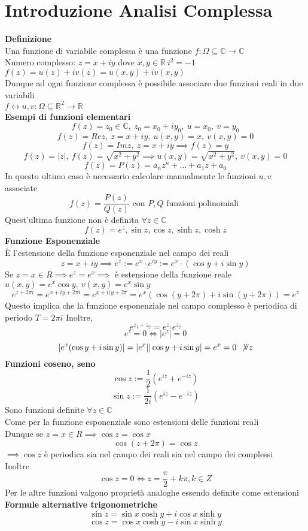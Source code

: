 
\section{Introduzione Analisi Complessa}
\textbf{Definizione}
\\Una funzione di variabile complessa è una funzione $f:\Omega\subseteq \mathbb{C}\to \mathbb{C}$
\\Numero complesso: $z=x+iy$ dove $x,y\in \mathbb{R}\ i^{2}=-1$
\\$f(z)=u(z)+iv(z)=u(x,y)+iv(x,y)$
\\Dunque ad ogni funzione complessa è possibile associare due funzioni reali in due variabili
\\$f\leftrightarrow u,v:\Omega\subseteq \mathbb{R}^2\to \mathbb{R}$
\\\textbf{Esempi di funzioni elementari}
\[
	f(z)=z_0\in\mathbb{C},\ z_0=x_0+iy_0,\ u=x_0,\  v=y_0
\]
\[
	f(z)=Rez,\  z=x+iy,\  u(x,y)=x
	,\ v(x,y)=0
\]
\[
	f(z)=Imz,\ z=x+iy\implies f(z)=y
\]
\[
	f(z)=|z|,\ f(z)=\sqrt{x^2+y^2} \implies u(x,y)=\sqrt{x^2+y^2} , \ v(x,y)=0
\]
\[
	f(z)=P(z)=a_nz^n+\ldots+a_1z+a_0
\]
In questo ultimo caso è necessario calcolare manualmente le funzioni $u,v$ associate
\[
	f(z)=\frac{P(z)}{Q(z)} \text{ con } P,Q \text{ funzioni polinomiali }
\]
Quest'ultima funzione non è definita $\forall z \in \mathbb{C}$
\[
	f(z)=e^z, \sin z, \cos z, \sinh z, \cosh z
\]
\textbf{Funzione Esponenziale}
\\È l'estensione della funzione esponenziale nel campo dei reali
\[
	z=x+iy\implies e^z:=e^x\cdot e^{iy}:=e^x\cdot(\cos y+i\sin y)
\]
Se $z=x\in R \implies e^z=e^x\implies$ è estensione della funzione reale
\\$u(x,y)=e^x \cos y,\ v(x,y)=e^x\sin y $
\[ e^{z+2\pi i}=e ^{x+iy+2\pi i}=e ^{x + i(y +2 \pi }=e^x(\cos (y+2 \pi)+i \sin (y+2 \pi))=e^z\]
Questo implica che la funzione esponenziale nel campo complesso è periodica di periodo $T=2 \pi i$
Inoltre,
\[e^{z_1+z_2}=e^{z_1}e^{z_2}
\]
\[
	e^z=0\iff|e^z|=0
\]
\[	
	|e^x(\cos y + i \sin y)|=|e^x| |\cos y +i\sin y|=e^x=0\ \not\forall z  
\]
\textbf{Funzioni coseno, seno}
\[\cos z:=\frac{1}{2}(e^{iz}+e^{-iz})\]
\[\sin z:=\frac{1}{2i}(e^{iz}-e^{-iz})\]
Sono funzioni definite $\forall z\in \mathbb C$
\\Come per la funzione esponenziale sono estensioni delle funzioni reali
\\Dunque se $z=x\in R \implies \cos z = \cos x$
\[\cos(z+2\pi)=\cos z\]
$\implies \cos z$ è periodica sia nel campo dei reali sia nel campo dei complessi
\\Inoltre
\[\cos z =0\iff z=\frac{\pi}{2}+k\pi,k\in Z\]
Per le altre funzioni valgono proprietà analoghe essendo definite come estensioni
\\\textbf{Formule alternative trigonometriche}
\[\sin z= \sin x \cosh y + i \cos x \sinh y\]
\[\cos z = \cos x \cosh y - i \sin x \sinh y\]

